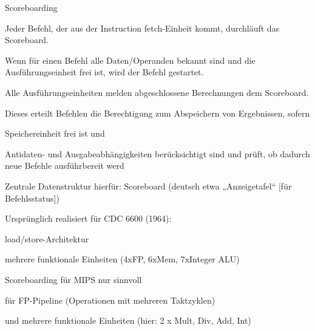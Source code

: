 \documentclass[10pt,landscape]{article}
\begin{document}
\begin{multicols}{3}
  Scoreboarding
  \begin{itemize*}
    \item Jeder Befehl, der aus der Instruction fetch-Einheit kommt, durchläuft das Scoreboard.
    \item Wenn für einen Befehl alle Daten/Operanden bekannt sind und die Ausführungseinheit frei ist, wird der Befehl gestartet.
    \item Alle Ausführungseinheiten melden abgeschlossene Berechnungen dem Scoreboard.
    \item Dieses erteilt Befehlen die Berechtigung zum Abspeichern von Ergebnissen, sofern
    \item Speichereinheit frei ist und
    \item Antidaten- und Ausgabeabhängigkeiten berücksichtigt sind und prüft, ob dadurch neue Befehle ausführbereit werd
    \item Zentrale Datenstruktur hierfür: Scoreboard (deutsch etwa „Anzeigetafel“ [für Befehlsstatus])
    \item Ursprünglich realisiert für CDC 6600 (1964):
    \item load/store-Architektur
    \item mehrere funktionale Einheiten (4xFP, 6xMem, 7xInteger ALU)
    \item Scoreboarding für MIPS nur sinnvoll
    \item für FP-Pipeline (Operationen mit mehreren Taktzyklen)
    \item und mehrere funktionale Einheiten (hier: 2 x Mult, Div, Add, Int)
  \end{itemize*}
  
  
  

\end{multicols}
\end{document}
